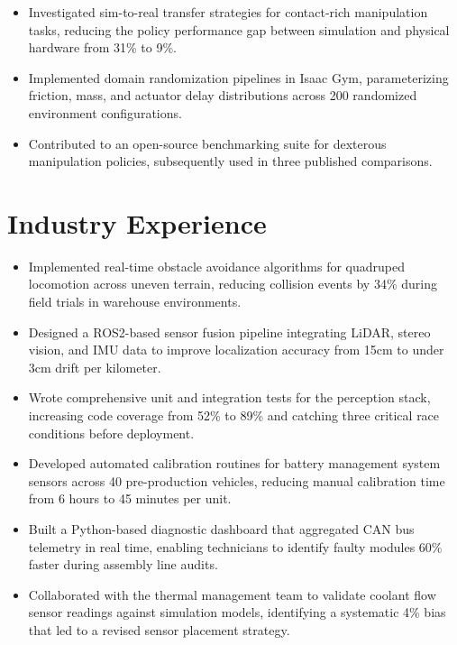 \documentclass{slate-resume}
\begin{document}
\begin{entryblock}
\begin{itemize}
  \item Investigated sim-to-real transfer strategies for contact-rich manipulation tasks, reducing the policy performance gap between simulation and physical hardware from 31\% to 9\%.
  \item Implemented domain randomization pipelines in Isaac Gym, parameterizing friction, mass, and actuator delay distributions across 200 randomized environment configurations.
  \item Contributed to an open-source benchmarking suite for dexterous manipulation policies, subsequently used in three published comparisons.
\end{itemize}
\end{entryblock}

\section{Industry Experience}
\begin{entryblock}
\begin{itemize}
  \item Implemented real-time obstacle avoidance algorithms for quadruped locomotion across uneven terrain, reducing collision events by 34\% during field trials in warehouse environments.
  \item Designed a ROS2-based sensor fusion pipeline integrating LiDAR, stereo vision, and IMU data to improve localization accuracy from 15cm to under 3cm drift per kilometer.
  \item Wrote comprehensive unit and integration tests for the perception stack, increasing code coverage from 52\% to 89\% and catching three critical race conditions before deployment.
\end{itemize}
\end{entryblock}
\entrygap
\begin{entryblock}
\begin{itemize}
  \item Developed automated calibration routines for battery management system sensors across 40 pre-production vehicles, reducing manual calibration time from 6 hours to 45 minutes per unit.
  \item Built a Python-based diagnostic dashboard that aggregated CAN bus telemetry in real time, enabling technicians to identify faulty modules 60\% faster during assembly line audits.
  \item Collaborated with the thermal management team to validate coolant flow sensor readings against simulation models, identifying a systematic 4\% bias that led to a revised sensor placement strategy.
\end{itemize}
\end{entryblock}
\end{document}
